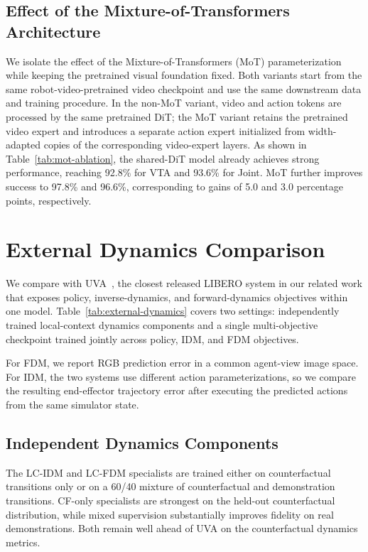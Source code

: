 \subsection{Effect of the Mixture-of-Transformers Architecture}
\label{app:mot-ablation}

We isolate the effect of the Mixture-of-Transformers (MoT) parameterization
while keeping the pretrained visual foundation fixed. Both variants start
from the same robot-video-pretrained video checkpoint and use the same
downstream data and training procedure. In the non-MoT variant, video and
action tokens are processed by the same pretrained DiT; the MoT variant retains the pretrained video expert and introduces a separate action expert initialized from width-adapted copies of the corresponding video-expert layers. As shown in Table~\ref{tab:mot-ablation}, the
shared-DiT model already achieves strong performance, reaching 92.8\% for
VTA and 93.6\% for Joint. MoT further improves success to 97.8\% and
96.6\%, corresponding to gains of 5.0 and 3.0 percentage points,
respectively. 

\section{External Dynamics Comparison}
\label{app:external-dynamics}

We compare \ours with UVA~\cite{li2503unified}, the closest released
LIBERO system in our related work that exposes policy, inverse-dynamics,
and forward-dynamics objectives within one model. Table~\ref{tab:external-dynamics}
covers two settings: independently trained local-context dynamics components
and a single multi-objective checkpoint trained jointly across policy, IDM,
and FDM objectives.

For FDM, we report RGB prediction error in a common agent-view image space.
For IDM, the two systems use different action parameterizations, so we compare
the resulting end-effector trajectory error after executing the predicted
actions from the same simulator state.

\subsection{Independent Dynamics Components}

The LC-IDM and LC-FDM specialists are trained either on counterfactual
transitions only or on a 60/40 mixture of counterfactual and demonstration
transitions. CF-only specialists are strongest on the held-out
counterfactual distribution, while mixed supervision substantially improves
fidelity on real demonstrations. Both remain well ahead of UVA on the
counterfactual dynamics metrics.

